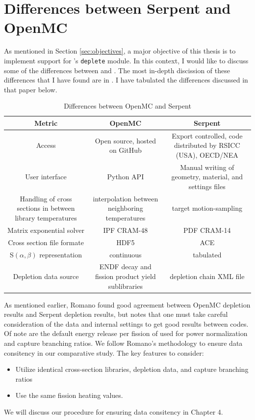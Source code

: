 \section{Differences between Serpent and OpenMC}
As mentioned in Section \ref{sec:objectives}, a major objective of this thesis
is to implement support for \OpenMC's \verb.deplete. module. In this context,
I would like to discuss some of the differences between \OpenMC and \SerpentTWO.
The most in-depth discission of these differences that I have found are in
\cite{romano_depletion_2021}. I have tabulated the differences discussed in that
paper below.
\begin{table}[htpb] 
    \centering 
    \caption{Differences between OpenMC and Serpent} 
    \label{tab:mc_code_diffs}
    \begin{tabulary}{\linewidth}{|C|C|C|} 
        \hline
        Metric & OpenMC & Serpent \\ 
        \hline 
        Access & Open source, hosted on GitHub & Export controlled, code distributed by RSICC (USA), OECD/NEA\\
        \hline
        User interface & Python API & Manual writing of geometry, material, and settings files\\
        \hline 
        Handling of cross sections in between library temperatures & interpolation between neighboring temperatures & target motion-sampling \cite{viitanen_explicit_2012}\\
        \hline 
        Matrix exponential solver & IPF CRAM-48 & PDF CRAM-14 \\
        \hline
        Cross section file formate & HDF5 & ACE \\
        \hline
        S$(\alpha, \beta)$ representation & continuous & tabulated \\
        \hline
        Depletion data source & ENDF decay and fission product yield sublibraries & depletion chain XML file\\
        \hline
    \end{tabulary}
\end{table}
As mentioned earlier, Romano found good agreement between OpenMC depletion
results and Serpent depletion results, but notes that one must take careful
consideration of the data and internal settings to get good results between
codes. Of note are the default energy release per fission of 
used for power normalization and capture branching ratios. We follow
Romano's methodology to ensure data consitency in our comparative study. The key
features to consider:
\begin{itemize}
    \item Utilize identical cross-section libraries, depletion data, and capture branching ratios
    \item Use the same fission heating values.
\end{itemize}
We will discuss our procedure for ensuring data consitency in Chapter 4.

